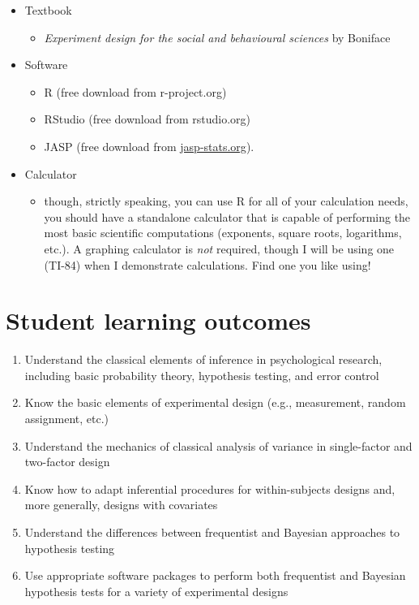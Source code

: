 \documentclass[10pt]{article}
\begin{document}
\begin{itemize}
\item Textbook
\begin{itemize}
\item \emph{Experiment design for the social and behavioural sciences} by Boniface
\end{itemize}
\item Software
\begin{itemize}
\item R (free download from r-project.org)
\item RStudio (free download from rstudio.org)
\item JASP (free download from \href{http://jasp-stats.org}{jasp-stats.org}).
\end{itemize}
\item Calculator
\begin{itemize}
\item though, strictly speaking, you can use R for all of your calculation needs, you should have a standalone calculator that is capable of performing the most basic scientific computations (exponents, square roots, logarithms, etc.). A graphing calculator is \emph{not} required, though I will be using one (TI-84) when I demonstrate calculations. Find one you like using!
\end{itemize}
\end{itemize}

\section*{Student learning outcomes}
\label{sec:org6b5068a}

\begin{enumerate}
\item Understand the classical elements of inference in psychological research, including basic probability theory, hypothesis testing, and error control
\item Know the basic elements of experimental design (e.g., measurement, random assignment, etc.)
\item Understand the mechanics of classical analysis of variance in single-factor and two-factor design
\item Know how to adapt inferential procedures for within-subjects designs and, more generally, designs with covariates
\item Understand the differences between frequentist and Bayesian approaches to hypothesis testing
\item Use appropriate software packages to perform both frequentist and Bayesian hypothesis tests for a variety of experimental designs
\end{enumerate}
\end{document}

